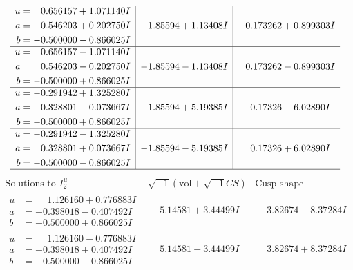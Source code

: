\documentclass[1p]{elsarticle_modified}
\theoremstyle{definition}
\newcommand{\I}{\sqrt{-1}}
\begin{document}
$$\begin{array}{c|c|c}
\begin{aligned}
u &= \phantom{-}0.656157 + 1.071140 I \\
a &= \phantom{-}0.546203 + 0.202750 I \\
b &= -0.500000 - 0.866025 I\end{aligned}
 & -1.85594 + 1.13408 I & \phantom{-}0.173262 + 0.899303 I \\ \hline\begin{aligned}
u &= \phantom{-}0.656157 - 1.071140 I \\
a &= \phantom{-}0.546203 - 0.202750 I \\
b &= -0.500000 + 0.866025 I\end{aligned}
 & -1.85594 - 1.13408 I & \phantom{-}0.173262 - 0.899303 I \\ \hline\begin{aligned}
u &= -0.291942 + 1.325280 I \\
a &= \phantom{-}0.328801 - 0.073667 I \\
b &= -0.500000 + 0.866025 I\end{aligned}
 & -1.85594 + 5.19385 I & \phantom{-}0.17326 - 6.02890 I \\ \hline\begin{aligned}
u &= -0.291942 - 1.325280 I \\
a &= \phantom{-}0.328801 + 0.073667 I \\
b &= -0.500000 - 0.866025 I\end{aligned}
 & -1.85594 - 5.19385 I & \phantom{-}0.17326 + 6.02890 I\\
 \hline 
 \end{array}$$\newpage$$\begin{array}{c|c|c}  
\text{Solutions to }I^u_{2}& \I (\text{vol} + \sqrt{-1}CS) & \text{Cusp shape}\\
 \hline 
\begin{aligned}
u &= \phantom{-}1.126160 + 0.776883 I \\
a &= -0.398018 - 0.407492 I \\
b &= -0.500000 + 0.866025 I\end{aligned}
 & \phantom{-}5.14581 + 3.44499 I & \phantom{-}3.82674 - 8.37284 I \\ \hline\begin{aligned}
u &= \phantom{-}1.126160 - 0.776883 I \\
a &= -0.398018 + 0.407492 I \\
b &= -0.500000 - 0.866025 I\end{aligned}
 & \phantom{-}5.14581 - 3.44499 I & \phantom{-}3.82674 + 8.37284 I \\ \hline\begin{aligned}

\end{aligned}
\end{array}$$
\end{document}
